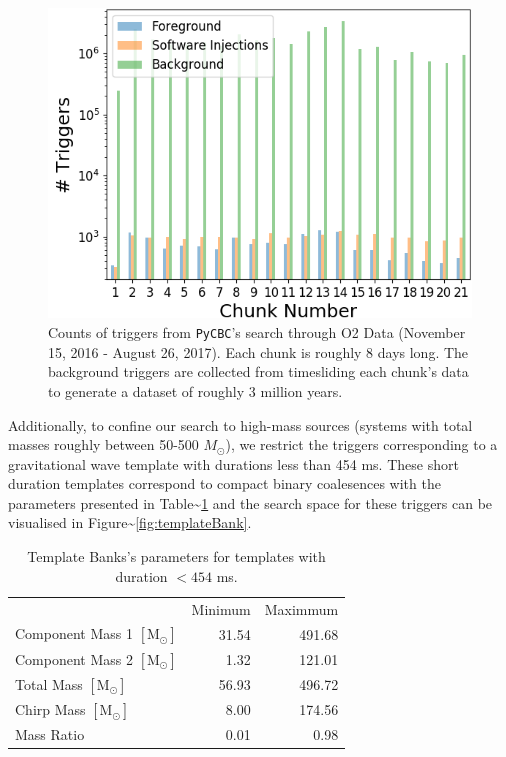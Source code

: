 \documentclass[%
 reprint,
 amsmath,amssymb,
 aps,
]{revtex4}
\begin{document}
\begin{figure}[!h]

{\centering \includegraphics[width=0.75\linewidth]{images/O2_unfiltered_trigger_counts} 

}

\caption[Count of all triggers in PyCBC O2 search]{Counts of triggers from \texttt{PyCBC}'s search through O2 Data (November 15, 2016 - August 26, 2017). Each chunk is roughly 8 days long. The background triggers are collected from timesliding each chunk's data to generate a dataset of roughly 3 million years.}\label{fig:o2TrigCount}
\end{figure}

Additionally, to confine our search to high-mass sources (systems with total masses roughly between 50-500
\(M_{\odot}\)), we restrict the triggers corresponding to a gravitational wave template with durations less than 454 ms.
These short duration templates correspond to compact binary coalesences with the parameters presented in
Table\textasciitilde\ref{tab:parameters} and the search space for these triggers can be visualised in Figure\textasciitilde\ref{fig:templateBank}.

\begin{table}[t]

\caption[BBH parameters corresponding to durations $<454$ ms]{\label{tab:parameters}Template Banks's parameters for templates with duration $<454$ ms.}
\centering
\begin{tabular}{lrr}
\toprule
  & Minimum & Maximmum\\
Component Mass 1 $[\text{M}_{\odot}]$ & 31.54 & 491.68\\
Component Mass 2 $[\text{M}_{\odot}]$ & 1.32 & 121.01\\
Total Mass $[\text{M}_{\odot}]$ & 56.93 & 496.72\\
Chirp Mass $[\text{M}_{\odot}]$ & 8.00 & 174.56\\
Mass Ratio & 0.01 & 0.98\\
\end{tabular}
\end{table}
\end{document}
